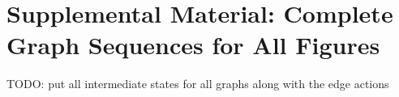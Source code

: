 
\section{Supplemental Material: Complete Graph Sequences for All Figures}%
\label{apx:Supplemental Material: Complete Graph Sequences for All Figures}

TODO: put all intermediate states for all graphs along with the edge actions
